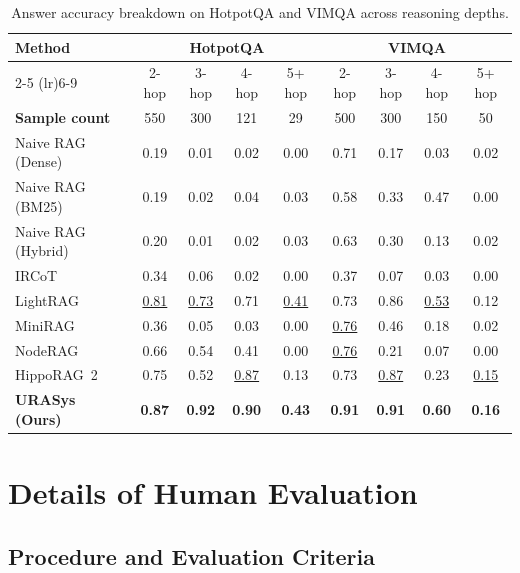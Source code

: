 \documentclass[11pt]{article}
\begin{document}
\begin{table}[t]
\centering
\caption{
Answer accuracy breakdown on HotpotQA and VIMQA across reasoning depths.
}
\label{tab:multihop-breakdown}
\begin{tabular}{l|cccc|cccc}
\toprule
\multirow{2}{*}{\textbf{Method}} & \multicolumn{4}{c|}{\textbf{HotpotQA}} & \multicolumn{4}{c}{\textbf{VIMQA}} \\
\cmidrule(lr){2-5} \cmidrule(lr){6-9}
& 2-hop & 3-hop & 4-hop & 5+ hop & 2-hop & 3-hop & 4-hop & 5+ hop \\
\midrule
\textbf{Sample count} & 550 & 300 & 121 & 29 & 500 & 300 & 150 & 50 \\
\midrule
 Naive RAG (Dense)    & 0.19 & 0.01 & 0.02 & 0.00 & 0.71 & 0.17 & 0.03 & 0.02 \\
Naive RAG (BM25)    & 0.19 & 0.02 & 0.04 & 0.03 & 0.58 & 0.33 & 0.47 & 0.00 \\
Naive RAG (Hybrid)   & 0.20 & 0.01 & 0.02 & 0.03 & 0.63 & 0.30 & 0.13 & 0.02 \\
\midrule
IRCoT        & 0.34 & 0.06 & 0.02 & 0.00 & 0.37 & 0.07 & 0.03 & 0.00 \\
LightRAG     & \underline{0.81} & \underline{0.73} & 0.71 & \underline{0.41} & 0.73 & 0.86 & \underline{0.53} & 0.12 \\
MiniRAG      & 0.36 & 0.05 & 0.03 & 0.00 & \underline{0.76} & 0.46 & 0.18 & 0.02 \\
NodeRAG      & 0.66 & 0.54 & 0.41 & 0.00 & \underline{0.76} & 0.21 & 0.07 & 0.00 \\
HippoRAG~2     & 0.75 & 0.52 & \underline{0.87} & 0.13 & 0.73 & \underline{0.87} & 0.23 & \underline{0.15} \\ \midrule
\textbf{URASys (Ours)} & \textbf{0.87} & \textbf{0.92} & \textbf{0.90} & \textbf{0.43} & \textbf{0.91} & \textbf{0.91} & \textbf{0.60} & \textbf{0.16} \\
\bottomrule
\end{tabular}
\end{table}




\section{Details of Human Evaluation}

\subsection{Procedure and Evaluation Criteria}
\end{document}
